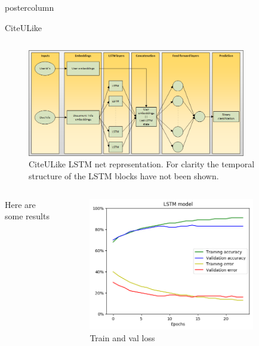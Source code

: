 \documentclass[final,hyperref={pdfpagelabels=false}]{beamer}
\begin{document}
\begin{frame}
\begin{columns}
\begin{column}{.49\paperwidth}
\begin{beamercolorbox}[center,wd=\textwidth]{postercolumn}
\begin{minipage}[T]{.99\textwidth}
{\begin{block}{CiteULike}
\begin{columns}
\begin{column}{1\textwidth}
\begin{minipage}[t]{0.96\textwidth}
\begin{figure}

\includegraphics[width=0.85\textwidth]{CiteuLikeLSTM.png}
 \caption{CiteULike LSTM net representation. For clarity the temporal structure of the LSTM blocks have not been shown.}
\end{figure}


\begin{columns}
 \begin{column}{0.45\textwidth}
 \justifying
 \footnotesize{
	Here are some results }
 \end{column}
 \begin{column}{0.49\textwidth}

\begin{figure}

\includegraphics[width=0.85\textwidth]{lstm.png}
 \caption{Train and val loss}
\end{figure}

 \end{column}
 \end{columns}



\end{minipage}






\end{column}
\end{columns}
\end{block}}
\end{minipage}
\end{beamercolorbox}
\end{column}
\end{columns}
\end{frame}
\end{document}
